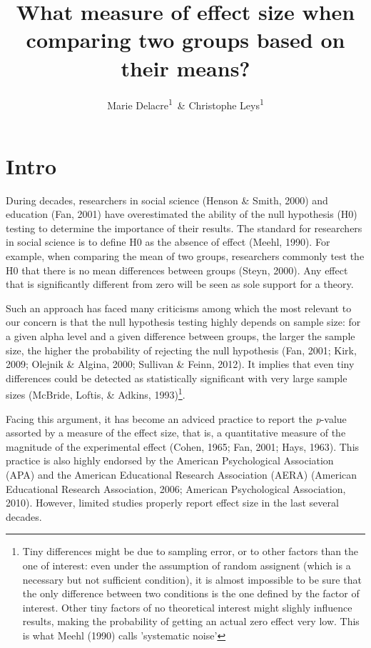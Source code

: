 \documentclass[man]{apa6}
\title{What measure of effect size when comparing two groups based on their means?}
\author{Marie Delacre\textsuperscript{1}~\& Christophe Leys\textsuperscript{1}}
\date{}
\affiliation{
\vspace{0.5cm}
\textsuperscript{1} Université Libre de Bruxelles, Service of Analysis of the Data (SAD), Bruxelles, Belgium}
\let\rmarkdownfootnote\footnote%
\def\footnote{\protect\rmarkdownfootnote}
\begin{document}
\maketitle

\hypertarget{intro}{%
\section{Intro}\label{intro}}

During decades, researchers in social science (Henson \& Smith, 2000) and education (Fan, 2001) have overestimated the ability of the null hypothesis (H0) testing to determine the importance of their results. The standard for researchers in social science is to define H0 as the absence of effect (Meehl, 1990). For example, when comparing the mean of two groups, researchers commonly test the H0 that there is no mean differences between groups (Steyn, 2000). Any effect that is significantly different from zero will be seen as sole support for a theory.

Such an approach has faced many criticisms among which the most relevant to our concern is that the null hypothesis testing highly depends on sample size: for a given alpha level and a given difference between groups, the larger the sample size, the higher the probability of rejecting the null hypothesis (Fan, 2001; Kirk, 2009; Olejnik \& Algina, 2000; Sullivan \& Feinn, 2012). It implies that even tiny differences could be detected as statistically significant with very large sample sizes (McBride, Loftis, \& Adkins, 1993)\footnote{Tiny differences might be due to sampling error, or to other factors than the one of interest: even under the assumption of random assignent (which is a necessary but not sufficient condition), it is almost impossible to be sure that the only difference between two conditions is the one defined by the factor of interest. Other tiny factors of no theoretical interest might slighly influence results, making the probability of getting an actual zero effect very low. This is what Meehl (1990) calls 'systematic noise'}.

Facing this argument, it has become an adviced practice to report the \emph{p}-value assorted by a measure of the effect size, that is, a quantitative measure of the magnitude of the experimental effect (Cohen, 1965; Fan, 2001; Hays, 1963). This practice is also highly endorsed by the American Psychological Association (APA) and the American Educational Research Association (AERA) (American Educational Research Association, 2006; American Psychological Association, 2010). However, limited studies properly report effect size in the last several decades.
\end{document}
